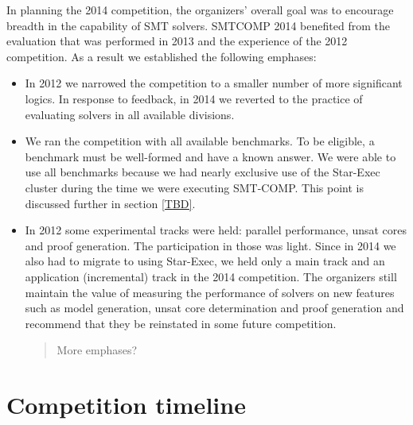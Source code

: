 \documentclass[twosize,11pt]{article}
\newcommand{\comment}[2]{\begin{quote}\sc #1\marginpar{\textcolor{red}{$\ast^{\mbox{#2}}$}}\end{quote}}
\newcommand{\davidc}[1]{\comment{#1}{DC}}
\begin{document}
In planning the 2014 competition, the organizers' overall goal was to encourage breadth
in the capability of SMT solvers. SMTCOMP 2014 benefited from the evaluation that was performed in 2013 and the experience of the 2012 competition. As a result we established the following emphases:
\begin{itemize}
\item In 2012 we narrowed the competition to a smaller number of more significant logics. In response to feedback, in 2014 we reverted to the practice of evaluating solvers in all available divisions.
\item We ran the competition with all available benchmarks. To be eligible, a benchmark must be well-formed and have a known answer. We were able to use all benchmarks because we had nearly exclusive use of the Star-Exec cluster during the time we were executing SMT-COMP. This point is discussed further in section \ref{TBD}.
\item In 2012 some experimental tracks were held: parallel performance, unsat cores and proof generation. The participation in those was light. Since in 2014 we also had to migrate to using Star-Exec, we held only a main track and an application (incremental) track in the 2014 competition. The organizers still maintain the value of measuring the performance of solvers on new features such as model generation, unsat core determination and proof generation and recommend that they be reinstated in some future competition.

\davidc{More emphases?}

\end{itemize}



\section{Competition timeline}
\label{sec:timeline}
\end{document}
